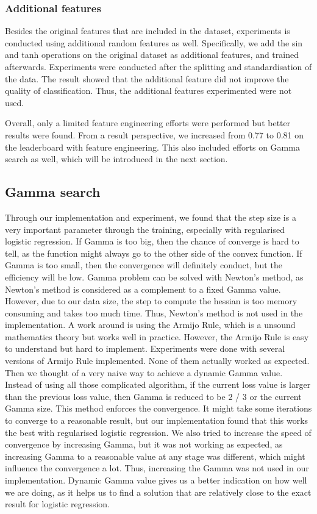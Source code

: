 \documentclass[10pt,conference,compsocconf]{IEEEtran}
\begin{document}
\subsubsection{Additional features}
Besides the original features that are included in the dataset, experiments is conducted using additional random features as well. Specifically, we add the sin and tanh operations on the original dataset as additional features, and trained afterwards. Experiments were conducted after the splitting and standardisation of the data. The result showed that the additional feature did not improve the quality of classification. Thus, the additional features experimented were not used.

Overall, only a limited feature engineering efforts were performed but better results were found. From a result perspective, we increased from 0.77 to 0.81 on the leaderboard with feature engineering. This also included efforts on Gamma search as well, which will be introduced in the next section.


\subsection{Gamma search}

Through our implementation and experiment, we found that the step size is a very important parameter through the training, especially with regularised logistic regression. If Gamma is too big, then the chance of converge is hard to tell, as the function might always go to the other side of the convex function. If Gamma is too small, then the convergence will definitely conduct, but the efficiency will be low. 
Gamma problem can be solved with Newton’s method, as Newton’s method is considered as a complement to a fixed Gamma value. However, due to our data size, the step to compute the hessian is too memory consuming and takes too much time. Thus, Newton’s method is not used in the implementation. 
A work around is using the Armijo Rule, which is a unsound mathematics theory but works well in practice. However, the Armijo Rule is easy to understand but hard to implement. Experiments were done with several versions of Armijo Rule implemented. None of them actually worked as expected. 
Then we thought of a very naive way to achieve a dynamic Gamma value. Instead of using all those complicated algorithm, if the current loss value is larger than the previous loss value, then Gamma is reduced to be 2 / 3 or the current Gamma size. This method enforces the convergence. It might take some iterations to converge to a reasonable result, but our implementation found that this works the best with regularised logistic regression. We also tried to increase the speed of convergence by increasing Gamma, but it was not working as expected, as increasing Gamma to a reasonable value at any stage was different, which might influence the convergence a lot. Thus, increasing the Gamma was not used in our implementation.
Dynamic Gamma value gives us a better indication on how well we are doing, as it helps us to find a solution that are relatively close to the exact result for logistic regression. 
\end{document}
